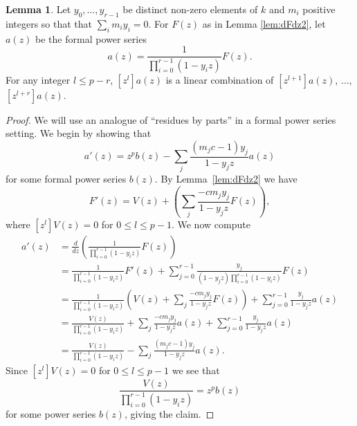 \documentclass{amsart}
\numberwithin{equation}{section}
\theoremstyle{definition}
\newtheorem{lemma}[theorem]{Lemma}
\begin{document}
\begin{lemma} \label{lem:resbyparts}
Let $y_0,\dots,y_{r-1}$ be distinct non-zero elements of $k$ and $m_i$ positive integers so that that $\sum_i m_iy_i=0$.  For $F(z)$ as in Lemma \ref{lem:dFdz2}, let $a(z)$ be the formal power series
\[
a(z)=\frac{1}{\prod_{i=0}^{r-1}(1-y_iz)}F(z).
\]
For any integer $l \le p-r$, $[z^l]a(z)$ is a linear combination of $[z^{l+1}]a(z)$, $\ldots$, $[z^{l+r}]a(z)$.
\end{lemma}
\begin{proof} 
We will use an analogue of ``residues by parts'' in a formal power series setting.   We begin by showing that 
\[
a'(z)=z^pb(z)-\sum_j \frac{(m_jc-1)y_j}{1-y_jz}a(z)
\]
for some formal power series $b(z)$. By Lemma~\ref{lem:dFdz2} we have
\[
F'(z)=V(z)+\left(\sum_j \frac{-cm_jy_j}{1-y_jz}F(z)\right),
\]
where $[z^l]V(z)=0$ for $0 \le l \le p-1$. 
We now compute
\begin{align*}
a'(z)&=\frac{d}{dz}\left(\frac{1}{\prod_{i=0}^{r-1}(1-y_iz)}F(z)\right)\\
&=\frac{1}{\prod_{i=0}^{r-1}(1-y_iz)}F'(z)+\sum_{j=0}^{r-1}\frac{y_j}{(1-y_jz)\prod_{i=0}^{r-1}(1-y_iz)}F(z)\\
&=\frac{1}{\prod_{i=0}^{r-1}(1-y_iz)}\left(V(z)+\sum_j \frac{-cm_jy_j}{1-y_jz}F(z)\right)+\sum_{j=0}^{r-1}\frac{y_j}{1-y_jz}a(z)\\
&=\frac{V(z)}{\prod_{i=0}^{r-1}(1-y_iz)}+\sum_j \frac{-cm_jy_j}{1-y_jz}a(z)+\sum_{j=0}^{r-1}\frac{y_j}{1-y_jz}a(z)\\
&=\frac{V(z)}{\prod_{i=0}^{r-1}(1-y_iz)}-\sum_j \frac{(m_jc-1)y_j}{1-y_jz}a(z).
\end{align*}
Since $[z^l]V(z)=0$ for $0 \le l \le p-1$ we see that 
\[
\frac{V(z)}{\prod_{i=0}^{r-1}(1-y_iz)}=z^pb(z)
\]
for some power series $b(z)$, giving the claim.


\end{proof}
\end{document}
